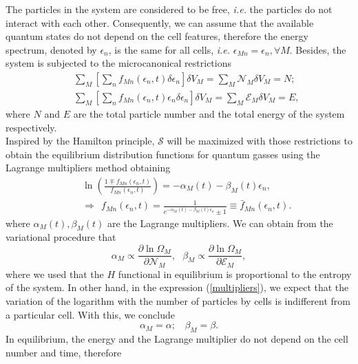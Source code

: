 \documentclass{article}
\newcommand{\de}{\delta}
\newcommand{\Ss}{\mathcal{S}}
\begin{document}
The particles in the system are considered to be free, \textit{i.e.} the particles do not interact with each other.
Consequently, we can assume that the available quantum states do not depend on the cell features,
therefore the energy spectrum, denoted by $\epsilon_n$, is the same for all cells, \textit{i.e.} $\epsilon_{Mn} = \epsilon_n, \forall M$. Besides, the system is subjected to the microcanonical restrictions
\begin{eqnarray}
    &&\sum_{M} \left[ \sum_{n}f_{Mn}(\epsilon_{n} ,t)\de \epsilon_n\right] \de V_M=\sum_{M} {\mathcal{N}}_{M} \de V_M=N; \nonumber \\
    &&\sum_{M}\left[ \sum_{n}f_{Mn}(\epsilon_{n},t)\epsilon_{n}\delta \epsilon_n\right] \de V_M=\sum_M {\mathcal{E}}_M \delta V_M=E, \label{restriccions1}
\end{eqnarray}
where $N$ and $E$ are the total particle number and the total energy of the system respectively.\\ 
Inspired by the Hamilton principle, $\Ss$ will be maximized with those restrictions to obtain the equilibrium distribution functions for quantum gasses using the Lagrange multipliers method obtaining
\begin{eqnarray}
&&\ln \left(\frac{1\mp f_{Mn}(\epsilon_{n},t)}{f_{Mn}(\epsilon_{n},t)} \right)=-\alpha_M(t)-\beta_M(t) \epsilon_{n}, \label{relation}\\ &&\Rightarrow \ \ f_{Mn}(\epsilon_{n},t)=\frac{1}{e^{-\alpha_M(t)-\beta_M(t) \epsilon_{n}}\pm 1} \equiv \bar{f}_{Mn}(\epsilon_{n},t) \label{distributionequilibrium}.
\end{eqnarray}
where $\alpha_M(t), \beta_M(t)$ are the Lagrange multipliers. We can obtain from the variational procedure that 
\begin{equation}
    \alpha_M\propto \frac{\partial \ln \Omega_M}{\partial \mathcal{N}_M}, \ \ \ \beta_M\propto \frac{\partial \ln \Omega_M}{\partial \mathcal{E}_M},\label{multipliers}
\end{equation}
where we used that the $H$ functional in equilibrium is proportional to the entropy of the system.
In other hand, in the expression (\ref{multipliers}), we expect that the variation of the logarithm with the number of particles by cells is indifferent from a particular cell. With this, we conclude  
\begin{equation}
    \alpha_M=\alpha; \ \ \ \ \beta_M=\beta.
\end{equation}
In equilibrium, the energy and the Lagrange multiplier do not depend on the cell number and time, therefore
\end{document}
